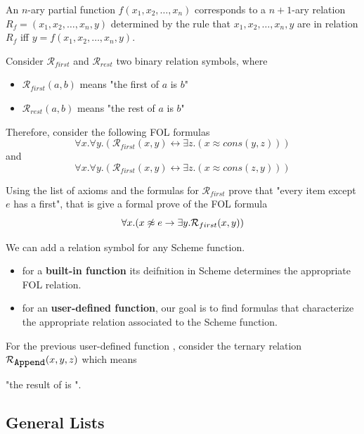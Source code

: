 \documentclass[english, 11pt]{article}
\begin{document}
  An $n$-ary partial function $f(x_1, x_2, \ldots, x_n)$ corresponds to a $n + 1$-ary relation $R_f = (x_1, x_2, \ldots, x_n, y)$ determined by the rule that $x_1, x_2, \ldots, x_n, y$ are in relation $R_f$ iff $y = f(x_1,x_2,\ldots,x_n,y)$.

  \begin{exmp}
    Consider $\mathcal{R}_{first}$ and $\mathcal{R}_{rest}$ two binary relation symbols, where
    \begin{itemize}
      \item $\mathcal{R}_{first}(a,b)$ means "the first of $a$ is $b$"
      \item $\mathcal{R}_{rest}(a,b)$ means "the rest of $a$ is $b$"
    \end{itemize}
    Therefore, consider the following FOL formulas
    \[ \forall x. \forall y. (\mathcal{R}_{first}(x,y) \leftrightarrow \exists z.(x \approx cons(y,z))) \]
    and
    \[ \forall x. \forall y. (\mathcal{R}_{first}(x,y) \leftrightarrow \exists z.(x \approx cons(z,y))) \]
  \end{exmp}

  \begin{exmp}
    Using the list of axioms and the formulas for $\mathcal{R}_{first}$ prove that "every item except $e$ has a first", that is give a formal prove of the FOL formula
    \[ \forall x. (x \not \approx e \rightarrow \exists y. \mathcal{R}_{first}(x,y)) \]
  \end{exmp}

  We can add a relation symbol for any Scheme function.

  \begin{itemize}
    \item for a \textbf{built-in function} its deifnition in Scheme determines the appropriate FOL relation.
    \item for an \textbf{user-defined function}, our goal is to find formulas that characterize the appropriate relation associated to the Scheme function.
  \end{itemize}

  For the previous user-defined function , consider the ternary relation $\mathcal{R}_{\mbox{\texttt{Append}}}(x,y,z)$ which means
  \begin{center}
    "the result of  is ".
  \end{center}

  \subsection{General Lists}
\end{document}
